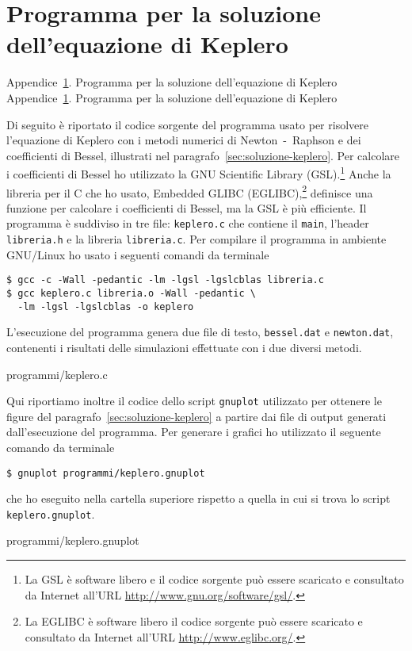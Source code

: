 \cleardoublepage{}
\chapter{Programma per la soluzione dell'equazione di Keplero}
\label{cha:soluzione-keplero}
\markboth%
{Appendice~\ref{cha:soluzione-keplero}. Programma per la soluzione
  dell'equazione di Keplero}%
{Appendice~\ref{cha:soluzione-keplero}. Programma per la soluzione
  dell'equazione di Keplero}

Di seguito è riportato il codice sorgente del programma usato per risolvere
l'equazione di Keplero con i metodi numerici di Newton~-~Raphson e dei
coefficienti di Bessel, illustrati nel
paragrafo~\ref{sec:soluzione-keplero}. Per calcolare i coefficienti di Bessel ho
utilizzato la GNU Scientific Library (GSL).\footnote{La GSL è software libero e
  il codice sorgente può essere scaricato e consultato da Internet all'URL
  \url{http://www.gnu.org/software/gsl/}.} Anche la libreria per il C che ho
usato, Embedded GLIBC (EGLIBC),\footnote{La EGLIBC è software libero il codice
  sorgente può essere scaricato e consultato da Internet all'URL
  \url{http://www.eglibc.org/}.} definisce una funzione per calcolare i
coefficienti di Bessel, ma la GSL è più efficiente. Il programma è suddiviso in
tre file: \verb|keplero.c| che contiene il \verb|main|, l'header
\verb|libreria.h| e la libreria \verb|libreria.c|. Per compilare il programma in
ambiente GNU/Linux ho usato i seguenti comandi da terminale
\begin{verbatim}
$ gcc -c -Wall -pedantic -lm -lgsl -lgslcblas libreria.c
$ gcc keplero.c libreria.o -Wall -pedantic \
  -lm -lgsl -lgslcblas -o keplero
\end{verbatim}
L'esecuzione del programma genera due file di testo, \verb|bessel.dat| e
\verb|newton.dat|, contenenti i risultati delle simulazioni effettuate con i due
diversi metodi.

{programmi/keplero.c}



Qui riportiamo inoltre il codice dello script \verb|gnuplot| utilizzato per
ottenere le figure del paragrafo~\ref{sec:soluzione-keplero} a partire dai file
di output generati dall'esecuzione del programma. Per generare i grafici ho
utilizzato il seguente comando da terminale
\begin{verbatim}
$ gnuplot programmi/keplero.gnuplot
\end{verbatim}
che ho eseguito nella cartella superiore rispetto a quella in cui si trova lo
script \verb|keplero.gnuplot|.

{programmi/keplero.gnuplot}

